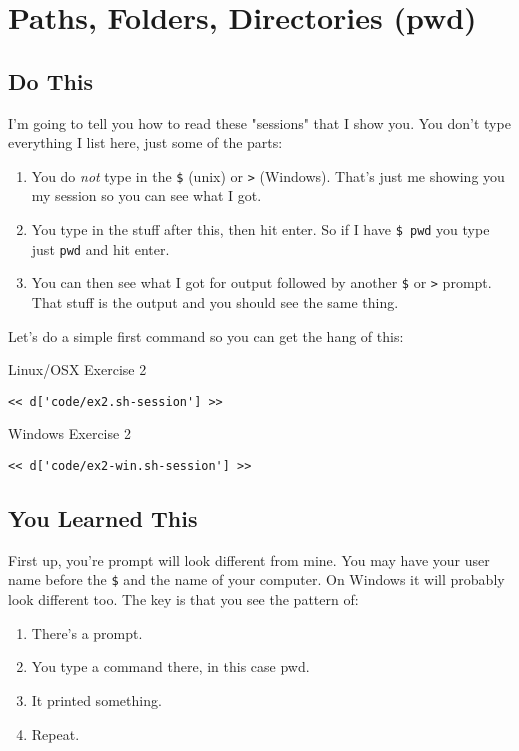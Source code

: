 \chapter{Paths, Folders, Directories (pwd)}

\section{Do This}

I'm going to tell you how to read these "sessions" that I show you.  You don't
type everything I list here, just some of the parts:

\begin{enumerate} 
\item You do \emph{not} type in the \verb|$| (unix) or
    \verb|>| (Windows).  That's just me showing you my session so you can see what
    I got.
\item You type in the stuff after this, then hit enter.  So if I have \verb|$ pwd| you type just \verb|pwd| and hit enter.
\item You can then see what I got for output followed by another \verb|$| or \verb|>| prompt.  That stuff is the output and you should see the same thing.
\end{enumerate}

Let's do a simple first command so you can get the hang of this:

\begin{code}{Linux/OSX Exercise 2}
\begin{Verbatim}
<< d['code/ex2.sh-session'] >>
\end{Verbatim}
\end{code}

\begin{code}{Windows Exercise 2}
\begin{Verbatim}
<< d['code/ex2-win.sh-session'] >>
\end{Verbatim}
\end{code}

\section{You Learned This}

First up, you're prompt will look different from mine.  You may have your user
name before the \verb|$| and the name of your computer.  On Windows it will
probably look different too.  The key is that you see the pattern of:

\begin{enumerate}
\item There's a prompt.
\item You type a command there, in this case pwd.
\item It printed something.
\item Repeat.
\end{enumerate}

